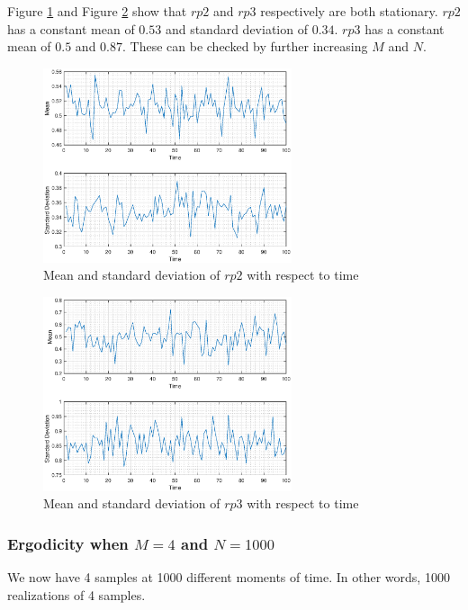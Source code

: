 Figure \ref{fig:ergodic_rp2} and Figure \ref{fig:ergodic_rp3} show that $rp2$ and $rp3$ respectively are both stationary. $rp2$ has a constant mean of $0.53$ and standard deviation of $0.34$. $rp3$ has a constant mean of $0.5$ and $0.87$. These can be checked by further increasing $M$ and $N$.

\begin{figure}[h!]
\centering
\includegraphics[width=0.65\textwidth]{ergodic_rp2}
\caption{\label{fig:ergodic_rp2} Mean and standard deviation of $rp2$ with respect to time}
\end{figure}

\begin{figure}[h!]
\centering
\includegraphics[width=0.65\textwidth]{ergodic_rp3}
\caption{\label{fig:ergodic_rp3} Mean and standard deviation of $rp3$ with respect to time}
\end{figure}

\pagebreak
\subsubsection{Ergodicity when $M=4$ and $N=1000$}

We now have 4 samples at 1000 different moments of time. In other words, 1000 realizations of 4 samples.\\

